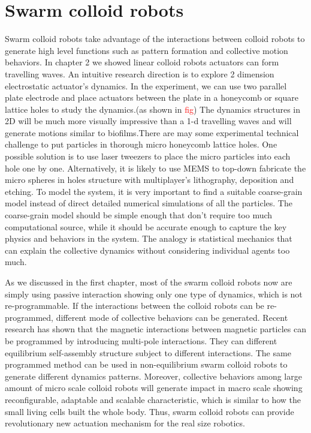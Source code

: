 \section{Swarm colloid robots}
Swarm colloid robots take advantage of the interactions between colloid robots to generate high level functions such as pattern formation and collective motion behaviors. In chapter 2 we showed linear colloid robots actuators can form travelling waves. An intuitive research direction is to explore 2 dimension electrostatic actuator's dynamics. In the experiment, we can use two parallel plate electrode and place actuators between the plate in a honeycomb or square lattice  holes to study the dynamics.(as shown in \textcolor{red}{fig}) The dynamics structures in 2D will be much more visually impressive than a 1-d travelling waves and will generate motions similar to biofilms.There are may some experimental technical challenge to put particles  in thorough micro honeycomb lattice holes. One possible solution is to use laser tweezers to place the micro particles into each hole one by one. Alternatively, it is likely to use MEMS to top-down fabricate the micro spheres in  holes structure with multiplayer's lithography, deposition and etching. To model the system, it is very important to find a suitable coarse-grain model instead of direct detailed numerical simulations of all the particles. The coarse-grain model should be simple enough that don't require too much computational source, while it should be accurate enough to capture the key physics and  behaviors in the system. The analogy is statistical mechanics that can explain the collective dynamics without considering individual agents too much.

As we discussed in the first chapter, most of the swarm colloid robots now are simply using passive interaction showing only one type of dynamics, which is not re-programmable. If the interactions between the colloid robots can be re-programmed, different mode of collective behaviors can be generated. Recent research has shown that the magnetic interactions between magnetic particles   can be programmed by introducing multi-pole interactions. They can  different  equilibrium self-assembly structure subject to different interactions. \cite{niu2019magnetic} The same programmed method can be used in non-equilibrium swarm colloid robots to generate different dynamics patterns. Moreover, collective behaviors among large amount of micro scale colloid robots  will generate impact in macro scale showing reconfigurable, adaptable and scalable characteristic,  which is similar to  how the small living cells built the whole body. Thus, swarm colloid robots can provide revolutionary new actuation mechanism for the real size robotics. 
